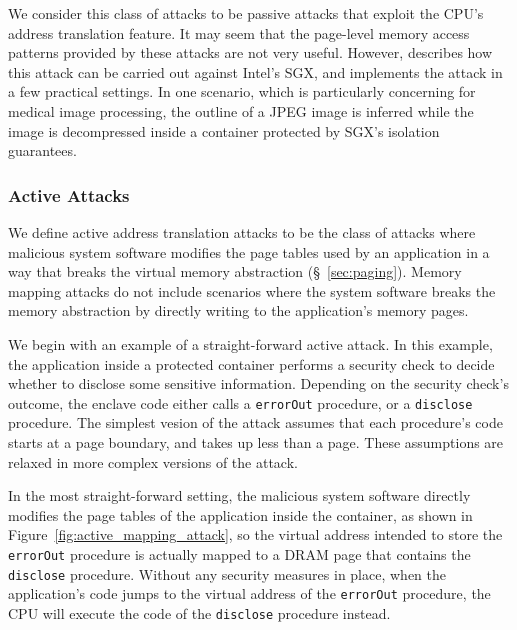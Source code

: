 We consider this class of attacks to be passive attacks that exploit the CPU's
address translation feature. It may seem that the page-level memory access
patterns provided by these attacks are not very useful. However,
\cite{xu2015pagefaults} describes how this attack can be carried out against
Intel's SGX, and implements the attack in a few practical settings. In one
scenario, which is particularly concerning for medical image processing,
the outline of a JPEG image is inferred while the image is decompressed inside
a container protected by SGX's isolation guarantees.


\subsubsection{Active Attacks}
\label{sec:memory_mapping_attacks}

We define active address translation attacks to be the class of attacks where
malicious system software modifies the page tables used by an application in
a way that breaks the virtual memory abstraction (\S~\ref{sec:paging}). Memory
mapping attacks do not include scenarios where the system software breaks the
memory abstraction by directly writing to the application's memory pages.

We begin with an example of a straight-forward active attack. In this example,
the application inside a protected container performs a security check to
decide whether to disclose some sensitive information. Depending on the
security check's outcome, the enclave code either calls a \texttt{errorOut}
procedure, or a \texttt{disclose} procedure. The simplest vesion of the attack
assumes that each procedure's code starts at a page boundary, and takes up less
than a page. These assumptions are relaxed in more complex versions of the
attack.

In the most straight-forward setting, the malicious system software directly
modifies the page tables of the application inside the container, as shown in
Figure~\ref{fig:active_mapping_attack}, so the virtual address intended to
store the \texttt{errorOut} procedure is actually mapped to a DRAM page that
contains the \texttt{disclose} procedure. Without any security measures in
place, when the application's code jumps to the virtual address of the
\texttt{errorOut} procedure, the CPU will execute the code of the
\texttt{disclose} procedure instead.

